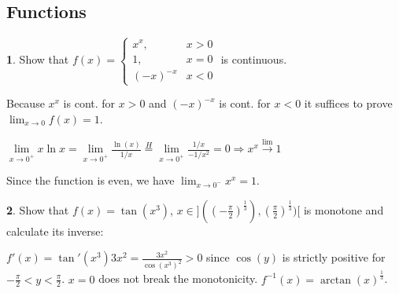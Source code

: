 \documentclass[a4paper, 10pt]{article}
\theoremstyle{definition}
\theoremstyle{ex}
\newtheorem*{exercise}{}
\theoremstyle{named}
\begin{document}
\subsection*{Functions}
\begin{exercise}
    Show that $f(x) = \begin{cases}
        x^x, & x > 0 \\
        1, & x = 0 \\
        (-x)^{-x}  & x < 0
    \end{cases}$ is continuous.
    \begin{exanswers}
        \item Because $x^x$ is cont. for $x > 0$ and $(-x)^{-x}$ is cont. for $x < 0$ it suffices to prove $\lim_{x \to 0} f(x) = 1$.
        \item $\lim\limits_{x \to 0^+} x \ln x = \lim\limits_{x \to 0^+} \frac{\ln(x)}{1 / x} \overset{H}{=} \lim\limits_{x \to 0^+} \frac{1 / x}{-1 / x^2} = 0 \Rightarrow x^x \overset{\lim}{\to} 1$
        \item Since the function is even, we have $\lim_{x \to 0^-} x^x = 1$.
    \end{exanswers}
\end{exercise}

\begin{exercise}
    Show that $f(x) = \tan(x^3)$, $x \in ]((-\frac{\pi}{2})^\frac{1}{3}), (\frac{\pi}{2})^\frac{1}{3})[$ is monotone and calculate its inverse:
    \begin{exanswers}
        \item $f'(x) = \tan'(x^3)3x^2 = \frac{3x^2}{\cos(x^3)^2} > 0$ since $\cos(y)$ is strictly positive for $-\frac{\pi}{2} < y < \frac{\pi}{2}$. $x = 0$ does not break the monotonicity. $f^{-1}(x) = \arctan(x)^\frac{1}{3}$.
    \end{exanswers}
\end{exercise}
\end{document}
